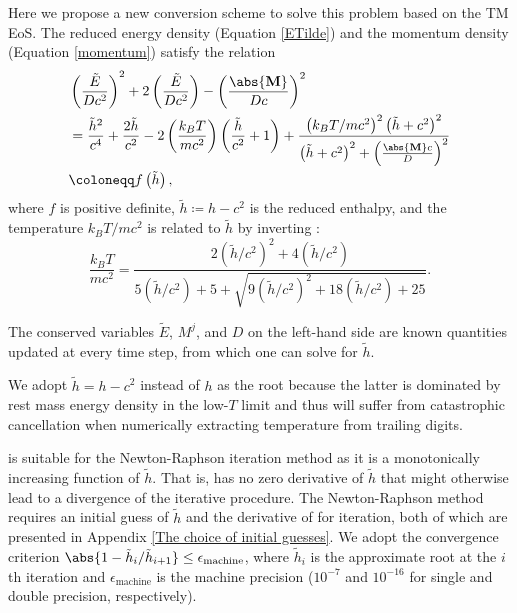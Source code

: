 Here we propose a new conversion scheme to solve this problem based on the TM EoS. The reduced energy density (Equation \ref{ETilde}) and the momentum density (Equation \ref{momentum}) satisfy the relation
\begin{equation}
\begin{aligned}
&\left(\frac{\tilde{E}}{Dc^2}\right)^2+2\left(\frac{\tilde{E}}{Dc^2}\right)-\left(\frac{\abs{\mathbf{M}}}{Dc}\right)^2
\\&= \frac{\tilde{h}^2}{c^4}+\frac{2\tilde{h}}{c^2}-2\left(\frac{k_{B}T}{mc^2}\right)\left(\frac{\tilde{h}}{c^2}+1\right)+\frac{\left(k_{B}T/mc^2\right)^2\left(\tilde{h}+c^2\right)^2}{\left(\tilde{h}+c^2\right)^2+\left(\frac{\abs{\mathbf{M}}c}{D}\right)^2}\\
&\coloneqq f\left(\tilde{h}\right),
\end{aligned}
\label{transcendental equation}
\end{equation}
where $f$ is positive definite, $\tilde{h}\coloneqq h-c^2$ is the reduced enthalpy, and the temperature $k_{B}T/mc^2$ is related to $\tilde{h}$ by inverting :
\begin{equation}
\frac{k_{B}T}{mc^2}=\frac{2\left(\tilde{h}/c^2\right)^2+4\left(\tilde{h}/c^2\right)}{5\left(\tilde{h}/c^2\right)+5+\sqrt{9\left(\tilde{h}/c^2\right)^2+18\left(\tilde{h}/c^2\right)+25}}.
\label{T of h}
\end{equation}

The conserved variables ${\tilde E}$, $M^{j}$, and $D$ on the left-hand side are known quantities updated at every time step, from which one can solve for $\tilde{h}$.

We adopt $\tilde{h}=h-c^2$ instead of $h$ as the root because the latter is dominated by rest mass energy density in the low-$T$ limit and thus will suffer from catastrophic cancellation when numerically extracting temperature from trailing digits.


 is suitable for the Newton-Raphson iteration method as it is a monotonically increasing function of $\tilde{h}$. That is,  has no zero derivative of $\tilde{h}$ that might otherwise lead to a divergence of the iterative procedure. The Newton-Raphson method requires an initial guess of $\tilde{h}$ and the derivative of  for iteration, both of which are presented in Appendix \ref{The choice of initial guesses}. We adopt the convergence criterion $\abs{1-\tilde{h}_{i}/\tilde{h}_{i+1}}\leq\epsilon_{\text{machine}}$, where $\tilde{h}_{i}$ is the approximate root at the $i$th iteration and $\epsilon_{\text{machine}}$ is the machine precision ($10^{-7}$ and $10^{-16}$ for single and double precision, respectively).

